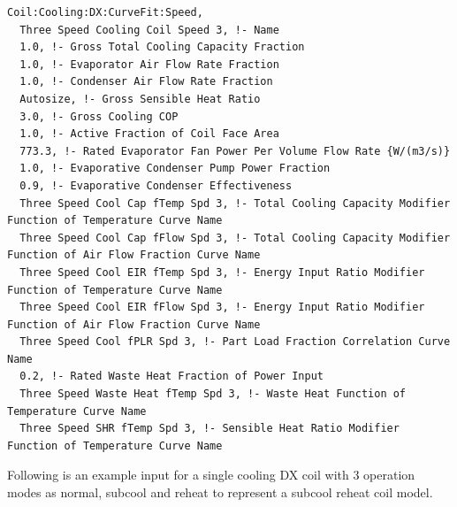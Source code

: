\begin{lstlisting}
Coil:Cooling:DX:CurveFit:Speed,
  Three Speed Cooling Coil Speed 3, !- Name
  1.0, !- Gross Total Cooling Capacity Fraction
  1.0, !- Evaporator Air Flow Rate Fraction
  1.0, !- Condenser Air Flow Rate Fraction
  Autosize, !- Gross Sensible Heat Ratio
  3.0, !- Gross Cooling COP
  1.0, !- Active Fraction of Coil Face Area
  773.3, !- Rated Evaporator Fan Power Per Volume Flow Rate {W/(m3/s)}
  1.0, !- Evaporative Condenser Pump Power Fraction
  0.9, !- Evaporative Condenser Effectiveness
  Three Speed Cool Cap fTemp Spd 3, !- Total Cooling Capacity Modifier Function of Temperature Curve Name
  Three Speed Cool Cap fFlow Spd 3, !- Total Cooling Capacity Modifier Function of Air Flow Fraction Curve Name
  Three Speed Cool EIR fTemp Spd 3, !- Energy Input Ratio Modifier Function of Temperature Curve Name
  Three Speed Cool EIR fFlow Spd 3, !- Energy Input Ratio Modifier Function of Air Flow Fraction Curve Name
  Three Speed Cool fPLR Spd 3, !- Part Load Fraction Correlation Curve Name
  0.2, !- Rated Waste Heat Fraction of Power Input
  Three Speed Waste Heat fTemp Spd 3, !- Waste Heat Function of Temperature Curve Name
  Three Speed SHR fTemp Spd 3, !- Sensible Heat Ratio Modifier Function of Temperature Curve Name

\end{lstlisting}

Following is an example input for a single cooling DX coil with 3 operation modes as normal, subcool and reheat to represent a subcool reheat coil model.

